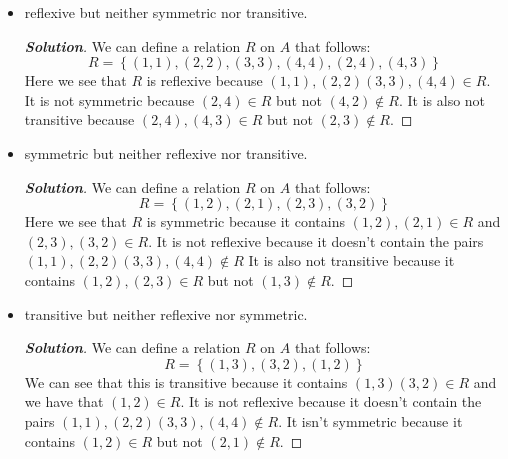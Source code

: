 \documentclass[11pt]{article}
\newenvironment{problem}[2][Problem\!]{\begin{trivlist}
\item[\hskip \labelsep {\bfseries #1}\hskip \labelsep {\bfseries #2.}]}{\end{trivlist}}
\newenvironment{solution}{\begin{proof}[\textbf{\textit{Solution}}]}{\end{proof}}
\newcommand{\set}[1]{\left\{#1\right\}} %
\begin{document}
\begin{problem}{7.1}
\begin{itemize}[itemsep=2em]
\item[(d)] reflexive but neither symmetric nor transitive.
\begin{solution}
We can define a relation \(R\) on \(A\) that follows:
\[R = \set{(1,1),(2,2),(3,3),(4,4), (2,4), (4,3)}\]
Here we see that \(R\) is reflexive because \((1,1),(2,2)(3,3),(4,4) \in R\). It is not symmetric because \((2,4) \in R\) but not \((4,2) \notin R\). It is also not transitive because \((2,4),(4,3) \in R\) but not \((2,3) \notin R\).
\end{solution}

\item[(e)] symmetric but neither reflexive nor transitive.
\begin{solution}
We can define a relation \(R\) on \(A\) that follows:
\[R = \set{(1, 2), (2, 1), (2, 3), (3, 2)}\]
Here we see that \(R\) is symmetric because it contains \((1,2),(2,1) \in R\) and \((2,3),(3,2) \in R\). It is not reflexive because it doesn't contain the pairs \((1,1),(2,2)(3,3),(4,4) \notin R\)
It is also not transitive because it contains \((1,2),(2,3) \in R\) but not \((1,3) \notin R\).
\end{solution}

\item[(f)] transitive but neither reflexive nor symmetric.
\begin{solution}
We can define a relation \(R\) on \(A\) that follows:
\[R = \set{(1,3),(3,2),(1,2)}\]
We can see that this is transitive because it contains \((1,3)(3,2) \in R\) and we have that \((1,2) \in R\). It is not reflexive because it doesn't contain the pairs \((1,1),(2,2)(3,3),(4,4) \notin R\). It isn't symmetric because it contains \((1,2) \in R\) but not \((2,1) \notin R\).
\end{solution}

\end{itemize}
\end{problem}

\newpage  %
\end{document}
